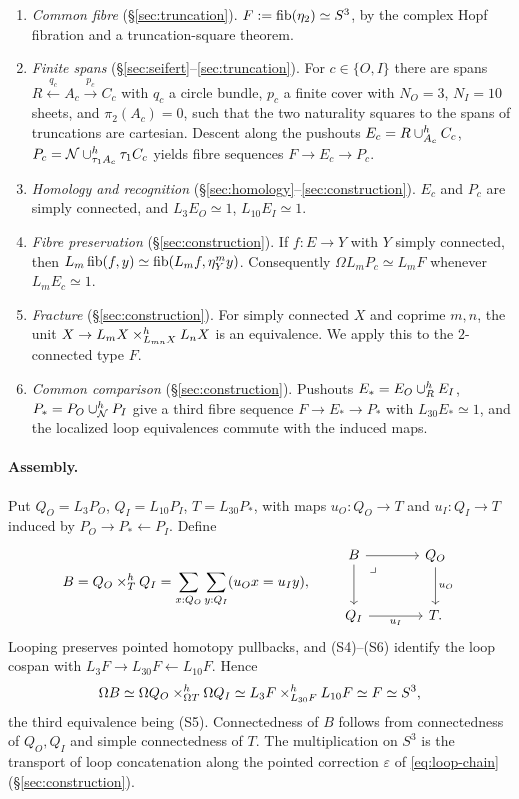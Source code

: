 \begin{enumerate}[label=(S\arabic*),leftmargin=3em]
\item \emph{Common fibre} (\S\ref{sec:truncation}). $F:=\operatorname{fib}(\eta_2)\simeq S^3$, by the complex Hopf fibration and a truncation-square theorem.
\item \emph{Finite spans} (\S\ref{sec:seifert}--\ref{sec:truncation}). For $c\in\{O,I\}$ there are spans $R\xleftarrow{q_c}A_c\xrightarrow{p_c}C_c$ with $q_c$ a circle bundle, $p_c$ a finite cover with $N_O=3$, $N_I=10$ sheets, and $\pi_2(A_c)=0$, such that the two naturality squares to the spans of truncations are cartesian. Descent along the pushouts $E_c=R\mathbin{\cup}^{h}_{A_c}C_c$, $P_c=\mathcal N\mathbin{\cup}^{h}_{\tau_1A_c}\tau_1C_c$ yields fibre sequences $F\to E_c\to P_c$.
\item \emph{Homology and recognition} (\S\ref{sec:homology}--\ref{sec:construction}). $E_c$ and $P_c$ are simply connected, and $L_3E_O\simeq1$, $L_{10}E_I\simeq1$.
\item \emph{Fibre preservation} (\S\ref{sec:construction}). If $f:E\to Y$ with $Y$ simply connected, then $L_m\operatorname{fib}(f,y)\simeq\operatorname{fib}(L_mf,\eta^m_Yy)$. Consequently $\Omega L_mP_c\simeq L_mF$ whenever $L_mE_c\simeq1$.
\item \emph{Fracture} (\S\ref{sec:construction}). For simply connected $X$ and coprime $m,n$, the unit $X\to L_mX\mathbin{\times}^{h}_{L_{mn}X}L_nX$ is an equivalence. We apply this to the $2$-connected type $F$.
\item \emph{Common comparison} (\S\ref{sec:construction}). Pushouts $E_*=E_O\mathbin{\cup}^{h}_RE_I$, $P_*=P_O\mathbin{\cup}^{h}_{\mathcal N}P_I$ give a third fibre sequence $F\to E_*\to P_*$ with $L_{30}E_*\simeq1$, and the localized loop equivalences commute with the induced maps.
\end{enumerate}

\paragraph{Assembly.}
Put $Q_O=L_3P_O$, $Q_I=L_{10}P_I$, $T=L_{30}P_*$, with maps $u_O:Q_O\to T$ and $u_I:Q_I\to T$ induced by $P_O\to P_*\leftarrow P_I$. Define
\begin{equation}\label{eq:B}
B=Q_O\hpb_TQ_I=\sum_{x:Q_O}\sum_{y:Q_I}(u_Ox=u_Iy),
\qquad
\begin{tikzcd}[column sep=large,row sep=large]
B \arrow[r] \arrow[d] \pbmark & Q_O \arrow[d,"u_O"] \\
Q_I \arrow[r,"u_I"'] & T.
\end{tikzcd}
\end{equation}
Looping preserves pointed homotopy pullbacks, and (S4)--(S6) identify the loop cospan with $L_3F\to L_{30}F\leftarrow L_{10}F$. Hence
\begin{equation}\label{eq:loop-chain}
\Omega B\simeq\Omega Q_O\mathbin{\times}^{h}_{\Omega T}\Omega Q_I\simeq L_3F\mathbin{\times}^{h}_{L_{30}F}L_{10}F\simeq F\simeq S^3,
\end{equation}
the third equivalence being (S5). Connectedness of $B$ follows from connectedness of $Q_O,Q_I$ and simple connectedness of $T$. The multiplication on $S^3$ is the transport of loop concatenation along the pointed correction $\varepsilon$ of \eqref{eq:loop-chain} (\S\ref{sec:construction}).


